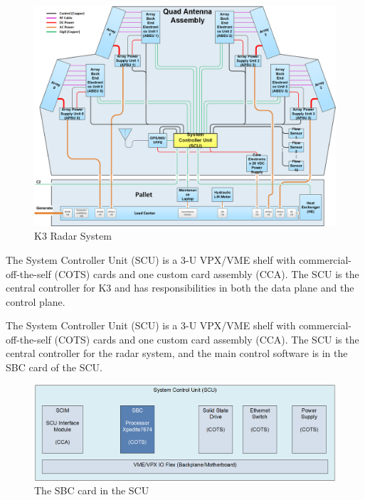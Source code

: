 \documentclass[12pt]{article}
\begin{document}
\begin{figure}[H]
    \begin{center}
    \includegraphics[width=1.0\textwidth]{img/k3}
    \caption{K3 Radar System}
    \label{fig:k3}
    \end{center}
\end{figure}

The System Controller Unit (SCU) is a 3-U VPX/VME shelf with commercial-off-the-self (COTS)
cards and one custom card assembly (CCA).  The SCU is the central controller for K3 and
has responsibilities in both the data plane and the control plane.

The System Controller Unit (SCU) is a 3-U VPX/VME shelf with commercial-off-the-self (COTS)
cards and one custom card assembly (CCA).  The SCU is the central controller for the radar system,
and the main control software is in the SBC card of the SCU.

\begin{figure}[H]
    \begin{center}
    \includegraphics[width=1.0\textwidth]{img/scu}
    \caption{The SBC card in the SCU}
    \label{fig:scu}
    \end{center}
\end{figure}
\end{document}
